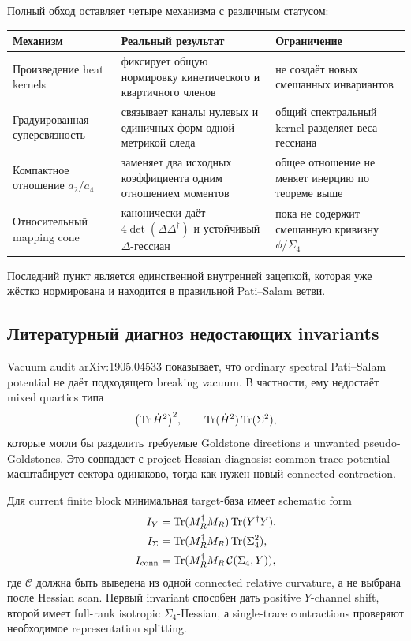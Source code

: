 Полный обход оставляет четыре механизма с различным статусом:
\begin{center}
\small
\begin{tabular}{>{\raggedright\arraybackslash}p{}>{\raggedright\arraybackslash}p{}>{\raggedright\arraybackslash}p{}}
\toprule
Механизм & Реальный результат & Ограничение\\
\midrule
Произведение heat kernels & фиксирует общую нормировку кинетического и
квартичного членов & не создаёт новых смешанных инвариантов\\
Градуированная суперсвязность & связывает каналы нулевых и единичных форм
одной метрикой следа & общий спектральный kernel разделяет веса гессиана\\
Компактное отношение \(a_2/a_4\) & заменяет два исходных коэффициента одним
отношением моментов & общее отношение не меняет инерцию по теореме выше\\
Относительный mapping cone & канонически даёт
\(4\det(\Delta\Delta^\dagger)\) и устойчивый \(\Delta\)-гессиан & пока не
содержит смешанную кривизну \(\phi/\Sigma_4\)\\
\bottomrule
\end{tabular}
\end{center}

Последний пункт является единственной внутренней зацепкой, которая уже
жёстко нормирована и находится в правильной Pati--Salam ветви.

\subsection{Литературный диагноз недостающих invariants}

Vacuum audit arXiv:1905.04533 показывает, что ordinary spectral
Pati--Salam potential не даёт подходящего breaking vacuum. В частности,
ему недостаёт mixed quartics типа
\begin{equation}
 \bigl(\operatorname{Tr} \dot H^2\bigr)^2,
 \qquad
 \operatorname{Tr}(\dot H^2)\operatorname{Tr}(\Sigma^2),
 \label{eq:ps-missing-mixed-invariants}
\end{equation}
которые могли бы разделить требуемые Goldstone directions и unwanted
pseudo-Goldstones. Это совпадает с project Hessian diagnosis: common trace
potential масштабирует сектора одинаково, тогда как нужен новый connected
contraction.

Для current finite block минимальная target-база имеет schematic form
\begin{align}
 I_Y&=\operatorname{Tr}(M_R^\dagger M_R)\operatorname{Tr}(Y^\dagger Y),\\
 I_\Sigma&=\operatorname{Tr}(M_R^\dagger M_R)\operatorname{Tr}(\Sigma_4^2),\\
 I_{\rm conn}&=\operatorname{Tr}(M_R^\dagger M_R\,\mathcal C(\Sigma_4,Y)),
\end{align}
где \(\mathcal C\) должна быть выведена из одной connected relative
curvature, а не выбрана после Hessian scan. Первый invariant способен дать
positive \(Y\)-channel shift, второй имеет full-rank isotropic
\(\Sigma_4\)-Hessian, а single-trace contractions проверяют необходимое
representation splitting.

